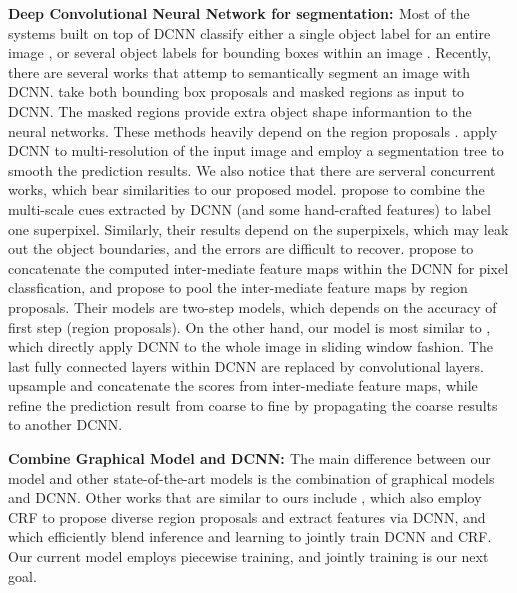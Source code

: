 {\bf{Deep Convolutional Neural Network for segmentation: }} Most of the systems built on top of DCNN classify either a single object label for an entire image \citep{KrizhevskyNIPS2013, simonyan2014very, szegedy2014going}, or several object labels for bounding boxes within an image \citep{papandreou2014untangling, girshick2014rcnn}. Recently, there are several works that attemp to semantically segment an image with DCNN. \citet{girshick2014rcnn, hariharan2014simultaneous} take both bounding box proposals and masked regions as input to DCNN. The masked regions provide extra object shape informantion to the neural networks. These methods heavily depend on the region proposals \citep{arbelaez2014multiscale, Uijlings13}. 
\citet{farabet2013learning} apply DCNN to multi-resolution of the input image and employ a segmentation tree to smooth the prediction results. We also notice that there are serveral concurrent works, which bear similarities to our proposed model. \citet{mostajabi2014feedforward} propose to combine the multi-scale cues extracted by DCNN (and some hand-crafted features) to label one superpixel. Similarly, their results depend on the superpixels, which may leak out the object boundaries, and the errors are difficult to recover. \citet{hariharan2014hypercolumns} propose to concatenate the computed inter-mediate feature maps within the DCNN for pixel classfication, and \citet{dai2014convolutional} propose to pool the inter-mediate feature maps by region proposals. Their models are two-step models, which depends on the accuracy of first step (\ie region proposals). On the other hand, our model is most similar to \citet{long2014fully, eigen2014predicting}, which directly apply DCNN to the whole image in sliding window fashion. The last fully connected layers within DCNN are replaced by convolutional layers. \citet{long2014fully} upsample and concatenate the scores from inter-mediate feature maps, while \citet{eigen2014predicting} refine the prediction result from coarse to fine by propagating the coarse results to another DCNN. 

{\bf{Combine Graphical Model and DCNN: }} The main difference between our model and other state-of-the-art models is the combination of graphical models and DCNN. Other works that are similar to ours include \citet{cogswell2014combining}, which also employ CRF to propose diverse region proposals \citep{yadollahpour2013discriminative} and extract features via DCNN, and \citet{chen2014learning} which efficiently blend inference and learning to jointly train DCNN and CRF. Our current model employs piecewise training, and jointly training is our next goal.



